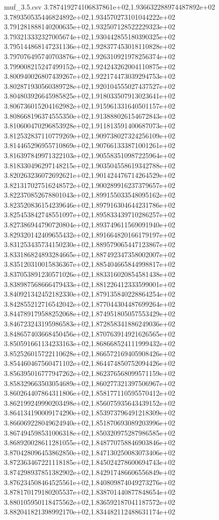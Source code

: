 \begin{filecontents*}{muf_3.5.csv}
3.787419274106837861e+02,1.936632288974487892e+02
3.789350535446824892e+02,1.934570273101044222e+02
3.791281888140200635e+02,1.932507128522229323e+02
3.793213332327005674e+02,1.930442855180390325e+02
3.795144868147231136e+02,1.928377453018110828e+02
3.797076495740703876e+02,1.926310921978256374e+02
3.799008215247499152e+02,1.924243262004110875e+02
3.800940026807439267e+02,1.922174473039294753e+02
3.802871930560389728e+02,1.920104555027437527e+02
3.804803926645985825e+02,1.918033507913023641e+02
3.806736015204162982e+02,1.915961331640501157e+02
3.808668196374555350e+02,1.913888026154672843e+02
3.810600470296853928e+02,1.911813591400687073e+02
3.812532837110779269e+02,1.909738027324256109e+02
3.814465296955710869e+02,1.907661333871001261e+02
3.816397849971322103e+02,1.905583510987225964e+02
3.818330496297148215e+02,1.903504558619342788e+02
3.820263236072692621e+02,1.901424476714264529e+02
3.821317027516248572e+02,1.900289916237379657e+02
3.822370852678801043e+02,1.899155033548095162e+02
3.823520836154239646e+02,1.897916304644231786e+02
3.825453842748551097e+02,1.895833439710286257e+02
3.827386944790720804e+02,1.893749611569091940e+02
3.829320142409655432e+02,1.891664820166179197e+02
3.831253435734150230e+02,1.889579065447123867e+02
3.833186824893284665e+02,1.887492347358002007e+02
3.835120310015836367e+02,1.885404665844998817e+02
3.837053891230571026e+02,1.883316020854581438e+02
3.838987568666479433e+02,1.881226412333599001e+02
3.840921342452182330e+02,1.879135840228864254e+02
3.842855212716542042e+02,1.877044304487699264e+02
3.844789179588252068e+02,1.874951805057553429e+02
3.846723243195986583e+02,1.872858341886249036e+02
3.848657403668450456e+02,1.870763914921626565e+02
3.850591661134233163e+02,1.868668524111999432e+02
3.852526015722110628e+02,1.866572169405908426e+02
3.854460467560471102e+02,1.864474850752094426e+02
3.856395016777947262e+02,1.862376568099571159e+02
3.858329663503054689e+02,1.860277321397506967e+02
3.860264407864311806e+02,1.858177110595570412e+02
3.862199249990203498e+02,1.856075935643439152e+02
3.864134190009174290e+02,1.853973796491218309e+02
3.866069228049624940e+02,1.851870693089203996e+02
3.867494598531006318e+02,1.850320975287986585e+02
3.868920028611281055e+02,1.848770758846903846e+02
3.870428096453862850e+02,1.847130250083073406e+02
3.872363467221118185e+02,1.845024278600694743e+02
3.874298937851382902e+02,1.842917486606556849e+02
3.876234508464525561e+02,1.840809874049273276e+02
3.878170179180205537e+02,1.838701440877848654e+02
3.880105950118475562e+02,1.836592187041187572e+02
3.882041821398992170e+02,1.834482112488631174e+02

\end{filecontents*}
